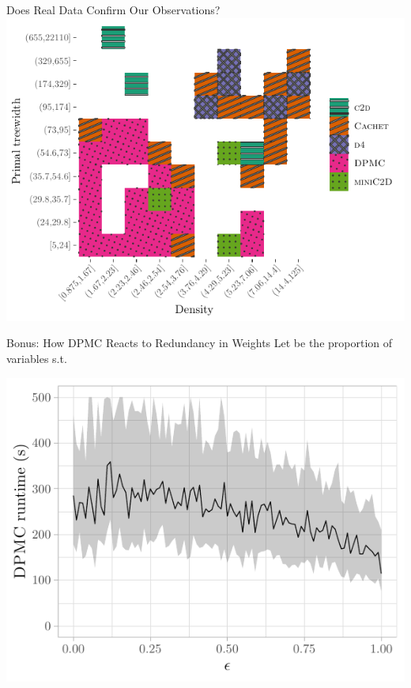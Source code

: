 \documentclass{beamer}
\begin{document}
\begin{frame}{Does Real Data Confirm Our Observations?}
  \centering
  \includegraphics{real}
\end{frame}

\begin{frame}{Bonus: How \textsc{DPMC} Reacts to Redundancy in Weights}
  Let \structure{$\epsilon$} be the proportion of variables  s.t.

  \centering
  \includegraphics{epsilon}
\end{frame}
\end{document}
